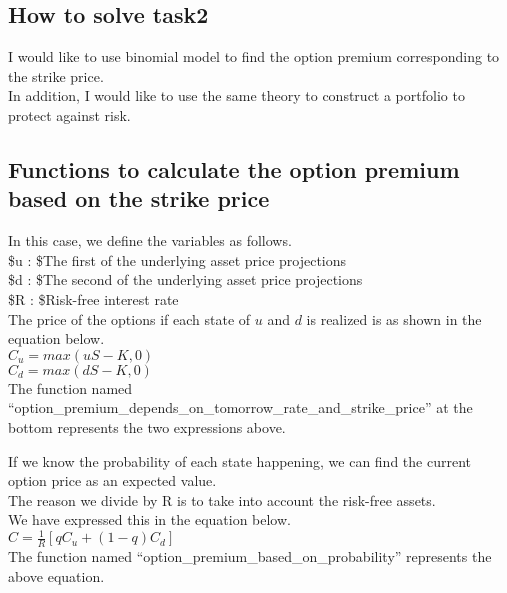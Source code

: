 \documentclass[11pt]{article}
\begin{document}
    \hypertarget{how-to-solve-task2}{%
\subsection{How to solve task2}\label{how-to-solve-task2}}

I would like to use binomial model to find the option premium
corresponding to the strike price.\\
In addition, I would like to use the same theory to construct a
portfolio to protect against risk.

    \hypertarget{functions-to-calculate-the-option-premium-based-on-the-strike-price}{%
\subsection{Functions to calculate the option premium based on the
strike
price}\label{functions-to-calculate-the-option-premium-based-on-the-strike-price}}

In this case, we define the variables as follows.\\
\$u : \$The first of the underlying asset price projections\\
\$d : \$The second of the underlying asset price projections\\
\$R : \$Risk-free interest rate\\
The price of the options if each state of \(u\) and \(d\) is realized is
as shown in the equation below.\\
\(C_u = max(uS - K, 0)\)\\
\(C_d = max(dS - K, 0)\)\\
The function named
``option\_premium\_depends\_on\_tomorrow\_rate\_and\_strike\_price'' at
the bottom represents the two expressions above.

If we know the probability of each state happening, we can find the
current option price as an expected value.\\
The reason we divide by R is to take into account the risk-free
assets.\\
We have expressed this in the equation below.\\
\(C = \frac{1}{R}[qC_u + (1-q)C_d]\)\\
The function named ``option\_premium\_based\_on\_probability''
represents the above equation.
\end{document}
